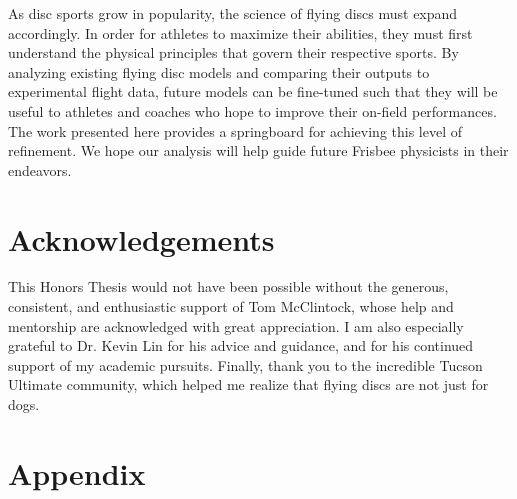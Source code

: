 \documentclass[a4paper,12pt, oneside]{article}
\begin{document}
As disc sports grow in popularity, the science of flying discs must expand accordingly. In order for athletes to maximize their abilities, they must first understand the physical principles that govern their respective sports. By analyzing existing flying disc models and comparing their outputs to experimental flight data, future models can be fine-tuned such that they will be useful to athletes and coaches who hope to improve their on-field performances. The work presented here provides a springboard for achieving this level of refinement. We hope our analysis will help guide future Frisbee physicists in their endeavors.
\section{Acknowledgements}
This Honors Thesis would not have been possible without the generous, consistent, and enthusiastic support of Tom McClintock, whose help and mentorship are acknowledged with great appreciation. I am also especially grateful to Dr. Kevin Lin for his advice and guidance, and for his continued support of my academic pursuits. Finally, thank you to the incredible Tucson Ultimate community, which helped me realize that flying discs are not just for dogs.



\section*{Appendix}
\end{document}
